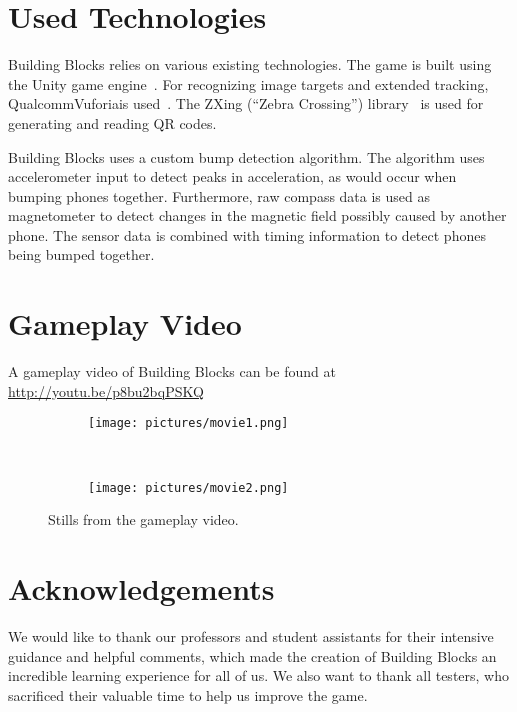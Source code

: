 \documentclass{chi-ext}
\begin{document}
\section{Used Technologies}
Building Blocks relies on various existing technologies. The game is built using the Unity game engine~\cite{Unity}. For recognizing image targets and extended tracking, Qualcomm\textsuperscript\textregistered Vuforia\textsuperscript\texttrademark is used~\cite{Vuforia}. The ZXing (``Zebra Crossing'') library~\cite{ZXing} is used for generating and reading QR codes.

Building Blocks uses a custom bump detection algorithm. The algorithm uses accelerometer input to detect peaks in acceleration, as would occur when bumping phones together. Furthermore, raw compass data is used as magnetometer to detect changes in the magnetic field possibly caused by another phone. The sensor data is combined with timing information to detect phones being bumped together.


\section{Gameplay Video}
A gameplay video of Building Blocks can be found at \url{http://youtu.be/p8bu2bqPSKQ}

\begin{figure} 
  \begin{subfigure}[b]{1\linewidth}
    \centering
    \texttt{[image: pictures/movie1.png]}
  \end{subfigure}%
  \\
  \begin{subfigure}[b]{1\linewidth}
    \centering
    \texttt{[image: pictures/movie2.png]}
  \end{subfigure} 
  \caption{Stills from the gameplay video.}
  \label{fig:movie2} 
\end{figure}


\section{Acknowledgements}
We would like to thank our professors and student assistants for their intensive guidance and helpful comments, which made the creation of Building Blocks an incredible learning experience for all of us. We also want to thank all testers, who sacrificed their valuable time to help us improve the game.

\balance


\end{document}
